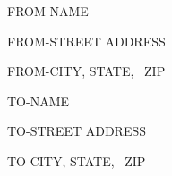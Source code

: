\documentclass{letter}
\begin{document}
 
FROM-NAME
 
FROM-STREET ADDRESS
 
FROM-CITY, STATE, \ ZIP
 
\vspace{1.0in}\large
\setlength\parindent{3.6in}
 
TO-NAME
 
TO-STREET ADDRESS
 
TO-CITY, STATE, \ ZIP
 
\end{document}

